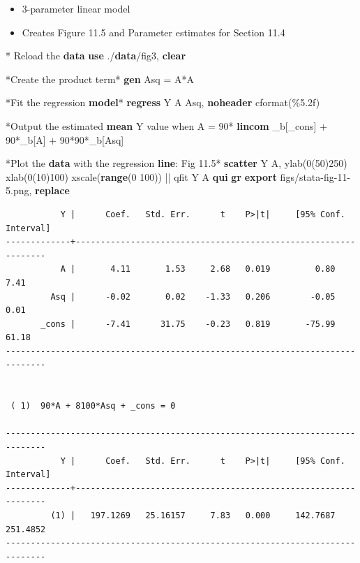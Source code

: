 \documentclass[
  10pt,
]{book}
\newenvironment{Shaded}{\begin{snugshade}}{\end{snugshade}}
\newcommand{\BaseNTok}[1]{\textcolor[rgb]{0.00,0.00,0.81}{#1}}
\newcommand{\DataTypeTok}[1]{\textcolor[rgb]{0.13,0.29,0.53}{#1}}
\newcommand{\KeywordTok}[1]{\textcolor[rgb]{0.13,0.29,0.53}{\textbf{#1}}}
\newcommand{\NormalTok}[1]{#1}
\newcommand{\OtherTok}[1]{\textcolor[rgb]{0.56,0.35,0.01}{#1}}
\providecommand{\tightlist}{%
  \setlength{\itemsep}{0pt}\setlength{\parskip}{0pt}}
\begin{document}
\begin{itemize}
\tightlist
\item
  3-parameter linear model
\item
  Creates Figure 11.5 and Parameter estimates for Section 11.4
\end{itemize}

\begin{Shaded}
\begin{Highlighting}[]
\NormalTok{* Reload the }\KeywordTok{data}
\KeywordTok{use}\NormalTok{ ./}\KeywordTok{data}\NormalTok{/fig3, }\KeywordTok{clear}

\NormalTok{*Create the product term*}
\KeywordTok{gen}\NormalTok{ Asq = A*A}

\NormalTok{*Fit the regression }\KeywordTok{model}\NormalTok{*}
\KeywordTok{regress}\NormalTok{ Y A Asq, }\KeywordTok{noheader}\NormalTok{ cformat(\%5.2f)}

\NormalTok{*Output the estimated }\KeywordTok{mean}\NormalTok{ Y }\OtherTok{value}\NormalTok{ when A = 90*}
\KeywordTok{lincom}\NormalTok{ \_b[}\DataTypeTok{\_cons}\NormalTok{] + 90*\_b[A] + 90*90*\_b[Asq]}

\NormalTok{*Plot the }\KeywordTok{data}\NormalTok{ with the regression }\KeywordTok{line}\NormalTok{: Fig 11.5*}
\KeywordTok{scatter}\NormalTok{ Y A, ylab(0(50)250) xlab(0(10)100) }\BaseNTok{xscale}\NormalTok{(}\KeywordTok{range}\NormalTok{(0 100)) || qfit Y A}
\KeywordTok{qui} \KeywordTok{gr} \KeywordTok{export}\NormalTok{ figs/stata{-}fig{-}11{-}5.png, }\KeywordTok{replace}
\end{Highlighting}
\end{Shaded}

\begin{verbatim}
           Y |      Coef.   Std. Err.      t    P>|t|     [95% Conf. Interval]
-------------+----------------------------------------------------------------
           A |       4.11       1.53     2.68   0.019         0.80        7.41
         Asq |      -0.02       0.02    -1.33   0.206        -0.05        0.01
       _cons |      -7.41      31.75    -0.23   0.819       -75.99       61.18
------------------------------------------------------------------------------


 ( 1)  90*A + 8100*Asq + _cons = 0

------------------------------------------------------------------------------
           Y |      Coef.   Std. Err.      t    P>|t|     [95% Conf. Interval]
-------------+----------------------------------------------------------------
         (1) |   197.1269   25.16157     7.83   0.000     142.7687    251.4852
------------------------------------------------------------------------------
\end{verbatim}
\end{document}
